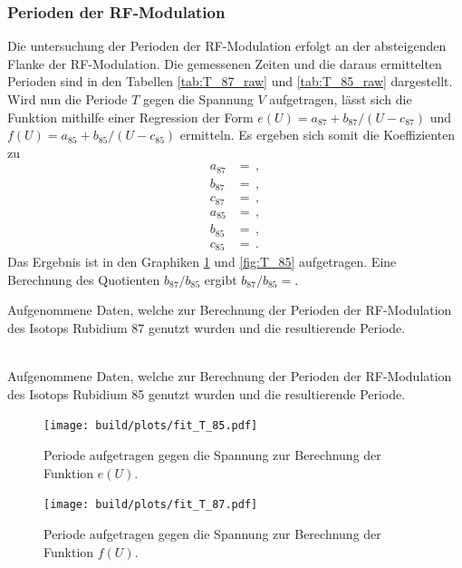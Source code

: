 \FloatBarrier
\subsubsection{Perioden der RF-Modulation} %
\label{ssub:perioden_der_rf_modulation}

Die untersuchung der Perioden der RF-Modulation erfolgt an der absteigenden Flanke der RF-Modulation.
Die gemessenen Zeiten und die daraus ermittelten Perioden sind in den Tabellen \ref{tab:T_87_raw} und \ref{tab:T_85_raw} dargestellt.
Wird nun die Periode $T$ gegen die Spannung $V$ aufgetragen, lässt sich die Funktion mithilfe einer Regression der Form $e(U)=a_\text{87} + b_\text{87}/(U - c_\text{87})$ und $f(U)=a_\text{85} + b_\text{85}/(U - c_\text{85})$ ermitteln.
Es ergeben sich somit die Koeffizienten zu
\begin{align*}
    a_\text{87} &=  \,,\\
    b_\text{87} &=  \,,\\
    c_\text{87} &=  \,,\\
    a_\text{85} &=  \,,\\
    b_\text{85} &=  \,,\\
    c_\text{85} &=  \,.
\end{align*}
Das Ergebnis ist in den Graphiken \ref{fig:T_87} und \ref{fig:T_85} aufgetragen.
Eine Berechnung des Quotienten $b_\text{87}/b_\text{85}$ ergibt $b_\text{87}/b_\text{85} = $.

\begin{table}[!h]
    \centering
    \caption{Aufgenommene Daten, welche zur Berechnung der Perioden der RF-Modulation des Isotops Rubidium 87 genutzt wurden und die resultierende Periode.}
    
    \label{tab:T_87_raw}
    \\
    \caption{Aufgenommene Daten, welche zur Berechnung der Perioden der RF-Modulation des Isotops Rubidium 85 genutzt wurden und die resultierende Periode.}
    
    \label{tab:T_85_raw}
\end{table}

\begin{figure}[!h]
    \centering
    \texttt{[image: build/plots/fit\_T\_85.pdf]}
    \caption{Periode aufgetragen gegen die Spannung zur Berechnung der Funktion $e(U)$.}
    \label{fig:T_85}
    \texttt{[image: build/plots/fit\_T\_87.pdf]}
    \caption{Periode aufgetragen gegen die Spannung zur Berechnung der Funktion $f(U)$.}
    \label{fig:T_87}
\end{figure}

